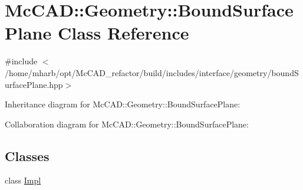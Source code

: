 \hypertarget{classMcCAD_1_1Geometry_1_1BoundSurfacePlane}{}\section{Mc\+C\+AD\+:\+:Geometry\+:\+:Bound\+Surface\+Plane Class Reference}
\label{classMcCAD_1_1Geometry_1_1BoundSurfacePlane}


{\ttfamily \#include $<$/home/mharb/opt/\+Mc\+C\+A\+D\+\_\+refactor/build/includes/interface/geometry/bound\+Surface\+Plane.\+hpp$>$}



Inheritance diagram for Mc\+C\+AD\+:\+:Geometry\+:\+:Bound\+Surface\+Plane\+:


Collaboration diagram for Mc\+C\+AD\+:\+:Geometry\+:\+:Bound\+Surface\+Plane\+:
\subsection*{Classes}
\begin{DoxyCompactItemize}
\item 
class \hyperlink{classMcCAD_1_1Geometry_1_1BoundSurfacePlane_1_1Impl}{Impl}
\end{DoxyCompactItemize}
